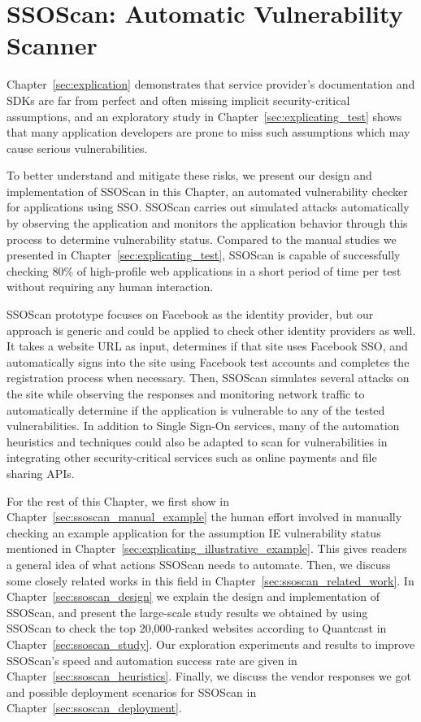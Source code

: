 \chapter{SSOScan: Automatic Vulnerability Scanner}
\label{sec:ssoscan}

Chapter~\ref{sec:explication} demonstrates that service provider's documentation and SDKs are far from perfect and often missing implicit security-critical assumptions, and an exploratory study in Chapter~\ref{sec:explicating_test} shows that many application developers are prone to miss such assumptions which may cause serious vulnerabilities.  

To better understand and mitigate these risks, we present our design and implementation of SSOScan in this Chapter, an automated vulnerability checker for applications using SSO.  SSOScan carries out simulated attacks automatically by observing the application and monitors the application behavior through this process to determine vulnerability status.  Compared to the manual studies we presented in Chapter~\ref{sec:explicating_test}, SSOScan is capable of successfully checking 80\% of high-profile web applications in a short period of time per test without requiring any human interaction.  

SSOScan prototype focuses on Facebook as the identity provider, but our approach is generic and could be applied to check other identity providers as well.  It takes a website URL as input, determines if that site uses Facebook SSO, and automatically signs into the site using Facebook test accounts and completes the registration process when necessary.  Then, SSOScan simulates several attacks on the site while observing the responses and monitoring network traffic to automatically determine if the application is vulnerable to any of the tested vulnerabilities.  In addition to Single Sign-On services, many of the automation heuristics and techniques could also be adapted to scan for vulnerabilities in integrating other security-critical services such as online payments and file sharing APIs.

For the rest of this Chapter, we first show in Chapter~\ref{sec:ssoscan_manual_example} the human effort involved in manually checking an example application for the assumption IE vulnerability status mentioned in Chapter~\ref{sec:explicating_illustrative_example}.  This gives readers a general idea of what actions SSOScan needs to automate.  Then, we discuss some closely related works in this field in Chapter~\ref{sec:ssoscan_related_work}.  In Chapter~\ref{sec:ssoscan_design} we explain the design and implementation of SSOScan, and present the large-scale study results we obtained by using SSOScan to check the top 20,000-ranked websites according to Quantcast in Chapter~\ref{sec:ssoscan_study}.  Our exploration experiments and results to improve SSOScan's speed and automation success rate are given in Chapter~\ref{sec:ssoscan_heuristics}.  Finally, we discuss the vendor responses we got and possible deployment scenarios for SSOScan in Chapter~\ref{sec:ssoscan_deployment}.

